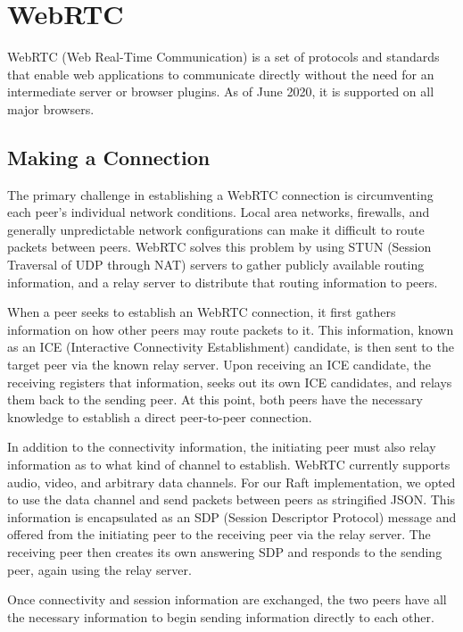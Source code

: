 \documentclass[11pt,twocolumn]{article}
\begin{document}
\section{WebRTC}

WebRTC \cite{webrtcwebsite} (Web Real-Time Communication) is a set of protocols and standards that enable web applications to communicate directly without the need for an intermediate server or browser plugins. As of June 2020, it is supported on all major browsers.

\subsection{Making a Connection}
The primary challenge in establishing a WebRTC connection is circumventing each peer's individual network conditions. Local area networks, firewalls, and generally unpredictable network configurations can make it difficult to route packets between peers. WebRTC solves this problem by using STUN (Session Traversal of UDP through NAT) servers to gather publicly available routing information, and a relay server to distribute that routing information to peers.

When a peer seeks to establish an WebRTC connection, it first gathers information on how other peers may route packets to it. This information, known as an ICE (Interactive Connectivity Establishment) candidate, is then sent to the target peer via the known relay server. Upon receiving an ICE candidate, the receiving registers that information, seeks out its own ICE candidates, and relays them back to the sending peer. At this point, both peers have the necessary knowledge to establish a direct peer-to-peer connection.

In addition to the connectivity information, the initiating peer must also relay information as to what kind of channel to establish. WebRTC currently supports audio, video, and arbitrary data channels. For our Raft implementation, we opted to use the data channel and send packets between peers as stringified JSON. This information is encapsulated as an SDP (Session Descriptor Protocol) message and offered from the initiating peer to the receiving peer via the relay server. The receiving peer then creates its own answering SDP and responds to the sending peer, again using the relay server.

Once connectivity and session information are exchanged, the two peers have all the necessary information to begin sending information directly to each other.
\end{document}
